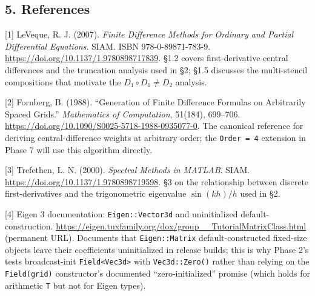 \subsection{5. References}\label{references}

{[}1{]} LeVeque, R. J. (2007). \emph{Finite Difference Methods for
Ordinary and Partial Differential Equations}. SIAM. ISBN
978-0-89871-783-9. \url{https://doi.org/10.1137/1.9780898717839}. §1.2
covers first-derivative central differences and the truncation analysis
used in §2; §1.5 discusses the multi-stencil compositions that motivate
the \(D_1 \circ D_1 \ne D_2\) analysis.

{[}2{]} Fornberg, B. (1988). ``Generation of Finite Difference Formulas
on Arbitrarily Spaced Grids.'' \emph{Mathematics of Computation},
51(184), 699--706.
\url{https://doi.org/10.1090/S0025-5718-1988-0935077-0}. The canonical
reference for deriving central-difference weights at arbitrary order;
the \passthrough{\lstinline!Order = 4!} extension in Phase 7 will use
this algorithm directly.

{[}3{]} Trefethen, L. N. (2000). \emph{Spectral Methods in MATLAB}.
SIAM. \url{https://doi.org/10.1137/1.9780898719598}. §3 on the
relationship between discrete first-derivatives and the trigonometric
eigenvalue \(\sin(k h)/h\) used in §2.

{[}4{]} Eigen 3 documentation: \passthrough{\lstinline!Eigen::Vector3d!}
and uninitialized default-construction.
\url{https://eigen.tuxfamily.org/dox/group__TutorialMatrixClass.html}
(permanent URL). Documents that \passthrough{\lstinline!Eigen::Matrix!}
default-constructed fixed-size objects leave their coefficients
uninitialized in release builds; this is why Phase 2's tests
broadcast-init \passthrough{\lstinline!Field<Vec3d>!} with
\passthrough{\lstinline!Vec3d::Zero()!} rather than relying on the
\passthrough{\lstinline!Field(grid)!} constructor's documented
``zero-initialized'' promise (which holds for arithmetic
\passthrough{\lstinline!T!} but not for Eigen types).
